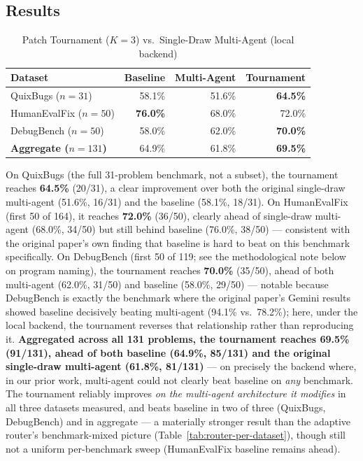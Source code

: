 \documentclass[conference]{IEEEtran}
\begin{document}
\subsection{Results}
\begin{table}[h]
\centering
\caption{Patch Tournament ($K{=}3$) vs.\ Single-Draw Multi-Agent (local backend)}
\label{tab:tournament}
\begin{tabular}{@{}lrrr@{}}
\toprule
Dataset & Baseline & Multi-Agent & \textbf{Tournament} \\
\midrule
QuixBugs ($n{=}31$)      & 58.1\% & 51.6\% & \textbf{64.5\%} \\
HumanEvalFix ($n{=}50$)  & \textbf{76.0\%} & 68.0\% & 72.0\% \\
DebugBench ($n{=}50$)    & 58.0\% & 62.0\% & \textbf{70.0\%} \\
\midrule
\textbf{Aggregate ($n{=}131$)} & 64.9\% & 61.8\% & \textbf{69.5\%} \\
\bottomrule
\end{tabular}
\end{table}

On QuixBugs (the full 31-problem benchmark, not a subset), the tournament reaches \textbf{64.5\%} (20/31), a clear improvement over both the original single-draw multi-agent (51.6\%, 16/31) and the baseline (58.1\%, 18/31). On HumanEvalFix (first 50 of 164), it reaches \textbf{72.0\%} (36/50), clearly ahead of single-draw multi-agent (68.0\%, 34/50) but still behind baseline (76.0\%, 38/50) — consistent with the original paper's own finding that baseline is hard to beat on this benchmark specifically. On DebugBench (first 50 of 119; see the methodological note below on program naming), the tournament reaches \textbf{70.0\%} (35/50), ahead of both multi-agent (62.0\%, 31/50) and baseline (58.0\%, 29/50) — notable because DebugBench is exactly the benchmark where the original paper's Gemini results showed baseline decisively beating multi-agent (94.1\% vs.\ 78.2\%); here, under the local backend, the tournament reverses that relationship rather than reproducing it. \textbf{Aggregated across all 131 problems, the tournament reaches 69.5\% (91/131), ahead of both baseline (64.9\%, 85/131) and the original single-draw multi-agent (61.8\%, 81/131)} — on precisely the backend where, in our prior work, multi-agent could not clearly beat baseline on \emph{any} benchmark. The tournament reliably improves \emph{on the multi-agent architecture it modifies} in all three datasets measured, and beats baseline in two of three (QuixBugs, DebugBench) and in aggregate — a materially stronger result than the adaptive router's benchmark-mixed picture (Table~\ref{tab:router-per-dataset}), though still not a uniform per-benchmark sweep (HumanEvalFix baseline remains ahead).
\end{document}
